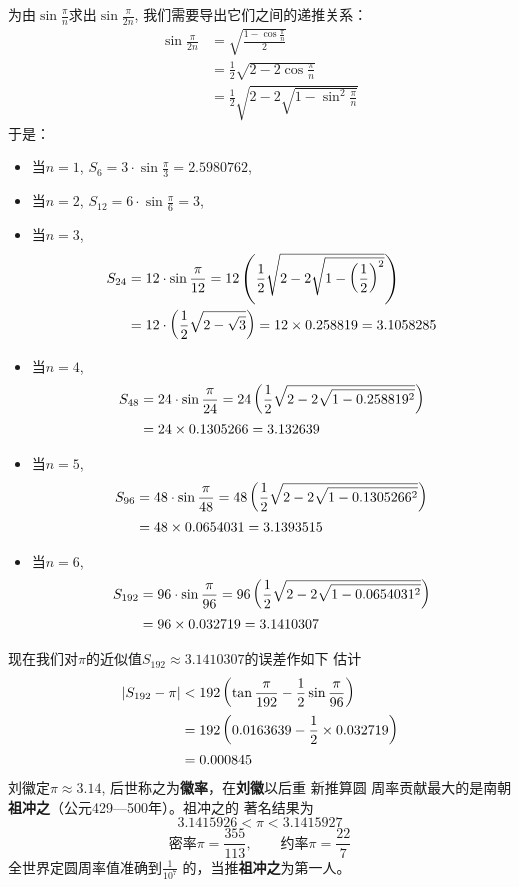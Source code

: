 为由$\sin\frac{\pi}{n}$求出$\sin\frac{\pi}{2n}$, 我们需要导出它们之间的递推关系：
\[\begin{split}
    \sin\frac{\pi}{2n}&=\sqrt{\frac{1-\cos\frac{\pi}{n}}{2}}\\
    &=\frac{1}{2}\sqrt{2-2\cos\frac{\pi}{n}}\\
    &=\frac{1}{2}\sqrt{2-2\sqrt{1-\sin^2\frac{\pi}{n}}}
\end{split}\]
于是：
\begin{itemize}
    \item 当$n=1$, $S_6=3\cdot \sin \frac{\pi}{3}=2.5980762$, 
    \item 当$n=2$, $S_{12}=6\cdot \sin \frac{\pi}{6}=3$,
    \item 当$n=3$, 
    \[\begin{split}
        S_{24}&=12\cdot \sin \dfrac{\pi}{12}=12\left(\dfrac{1}{2}\sqrt{2-2\sqrt{1-\left(\dfrac{1}{2}\right)^2}}\right)\\
        &=12\cdot \left(\dfrac{1}{2}\sqrt{2-\sqrt{3}}\right)=12\times 0.258819=3.1058285
    \end{split}\]
    \item 当$n=4$, 
    \[\begin{split}
        S_{48}&=24\cdot \sin \dfrac{\pi}{24}=24\left(\dfrac{1}{2}\sqrt{2-2\sqrt{1-0.258819^2}}\right)\\
        &=24\times 0.1305266=3.132639
    \end{split}\]
    \item 当$n=5$, 
    \[\begin{split}
        S_{96}&=48\cdot \sin \dfrac{\pi}{48}=48\left(\dfrac{1}{2}\sqrt{2-2\sqrt{1-0.1305266^2}}\right)\\
        &=48\times 0.0654031=3.1393515
    \end{split}\]
    \item 当$n=6$, 
    \[\begin{split}
        S_{192}&=96\cdot \sin \dfrac{\pi}{96}=96\left(\dfrac{1}{2}\sqrt{2-2\sqrt{1-0.0654031^2}}\right)\\
        &=96\times 0.032719=3.1410307
    \end{split}\]
\end{itemize}

现在我们对$\pi$的近似值$S_{192}\approx 3.1410307$的误差作如下
估计
\[\begin{split}
    |S_{192}-\pi|&<192\left(\tan\dfrac{\pi}{192}-\dfrac{1}{2}\sin\dfrac{\pi}{96}\right)\\
    &=192\left(0.0163639-\dfrac{1}{2}\times 0.032719\right)\\
    &=0.000845
\end{split}\]
刘徽定$\pi\approx 3.14$, 后世称之为\textbf{徽率}，在\textbf{刘徽}以后重 新推算圆
周率贡献最大的是南朝\textbf{祖冲之}（公元429—500年）。祖冲之的
著名结果为
\[3.1415926<\pi <3.1415927\]
\[\text{密率}\pi=\frac{355}{113},\qquad \text{约率}\pi=\frac{22}{7}\]
全世界定圆周率值准确到$\frac{1}{10^7}$
的，当推\textbf{祖冲之}为第一人。


